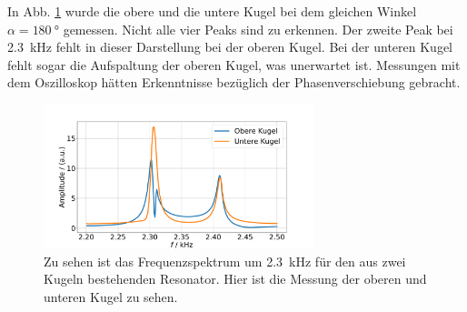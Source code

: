    
In Abb. \ref{fig:phase} wurde die obere und die untere Kugel bei dem gleichen Winkel $\alpha=\SI{180}{\degree}$ gemessen. 
Nicht alle vier Peaks sind zu erkennen. Der zweite Peak bei \SI{2.3}{\kilo\hertz} fehlt in dieser Darstellung bei der oberen Kugel. Bei der unteren Kugel fehlt sogar die Aufspaltung der oberen Kugel, was unerwartet ist. Messungen mit dem Oszilloskop hätten Erkenntnisse bezüglich der Phasenverschiebung gebracht. 

\begin{figure}
    \centering
    \includegraphics[width=0.7\textwidth]{plots/D_phase.pdf}
    \caption{Zu sehen ist das Frequenzspektrum um \SI{2.3}{\kilo\hertz} für den aus zwei Kugeln bestehenden Resonator. Hier ist die Messung der oberen und unteren Kugel zu sehen.}
    \label{fig:phase}
\end{figure}